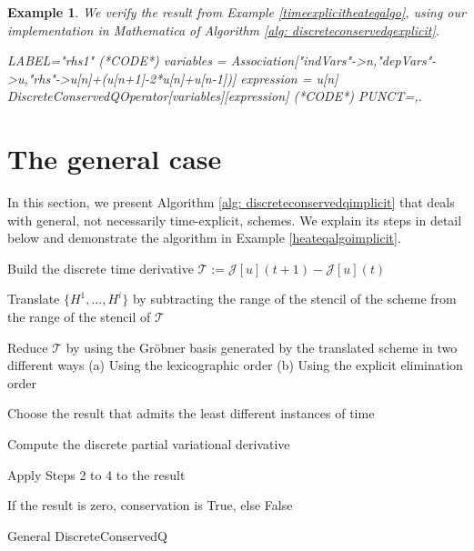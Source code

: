\documentclass[manuscript]{acmart}
\newcommand{\Rr}{{\mathbb{R}}}
\newcommand{\Nn}{{\mathbb{N}}}
\newcommand{\1}{{\chi}}
\newcommand{\Ii}{{\mathcal{I}}}
\numberwithin{equation}{section}
\theoremstyle{thmlemcorr}
\numberwithin{theorem}{section}
\theoremstyle{thmlemcorr*}
\theoremstyle{defi}
\theoremstyle{remexample}
\newtheorem{example}[theorem]{Example}
\theoremstyle{ass}
\begin{document}
\begin{example}
	\label{heatex1}
	We verify the result from Example \ref{timeexplicitheateqalgo}, using our implementation in {\sc Mathematica} of Algorithm \ref{alg: discreteconservedqexplicit}.
	\begin{EXE}
		LABEL="rhs1"
		(*CODE*)
		variables = Association["indVars"->{n},"depVars"->{u},"rhs"->{u[n]+(u[n+1]-2*u[n]+u[n-1])}]
		expression = u[n]
		DiscreteConservedQOperator[variables][expression]
		(*CODE*)
		PUNCT={,.}
	\end{EXE}
	\begin{small}
		
		
	\end{small}
\end{example}
\section{The general case}
\label{secgen}
In this section, we present Algorithm \ref{alg: discreteconservedqimplicit} that deals with general, not necessarily time-explicit, schemes. We explain its steps in detail below and demonstrate the algorithm in Example \ref{heateqalgoimplicit}.\\
\begin{algorithm}
	\DontPrintSemicolon
	\KwIn{$\mathcal{J}\in\mathcal{F}(\mathcal{P}(\Ii\times\Nn,\Rr^m),\mathcal{D}(\Nn))$ and $\{H^1,\ldots,H^i\}\subset\mathcal{S}(\mathcal{P}(\Ii\times\Nn,\Rr^m),\mathcal{P}(\Ii\times\Nn,\Rr))$ }
	
	\label{step1} Build the discrete time derivative $\mathcal{T}:=\mathcal{J}[u](t+1)-\mathcal{J}[u](t)$\;

	\label{step2}Translate $\{H^1,\ldots,H^i\}$ by subtracting the range of the stencil of the scheme from the range of the stencil of $\mathcal{T}$\;
	
	\label{step3} Reduce $\mathcal{T}$ by using the Gr{\"o}bner basis generated by the translated scheme in two different ways
	\label{step3a} (a) Using the lexicographic order
	\label{step3b} (b) Using the explicit elimination order\;
	
	\label{step4} Choose the result that admits the least different instances of time\;
	
	\label{step5} Compute the discrete partial variational derivative\;
	
	\label{step6} Apply Steps 2 to 4 to the result\;
	
	\label{step7} If the result is zero, conservation is {\sc True}, else {\sc False}\;
	
	\caption{{\sc General DiscreteConservedQ}}
	\label{alg: discreteconservedqimplicit}
\end{algorithm}
\end{document}
